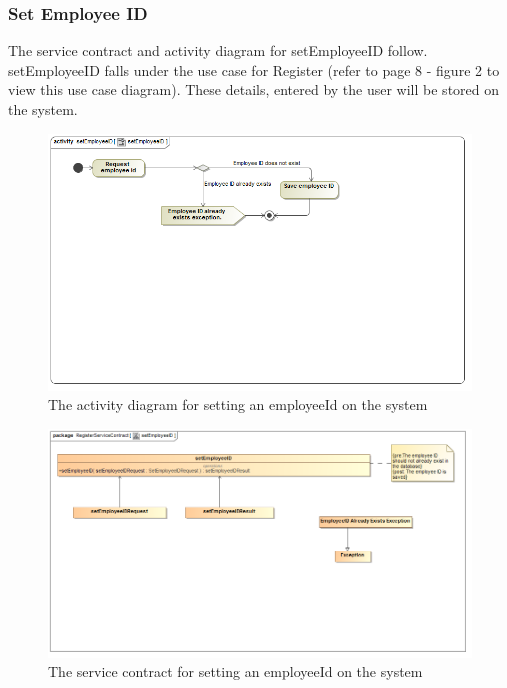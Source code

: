 \documentclass[a4paper,12pt]{report}
\begin{document}
\subsubsection{Set Employee ID }
The service contract and activity diagram for setEmployeeID follow. setEmployeeID falls under the use case for Register (refer to page 8 - figure 2 to view this use case diagram). These details, entered by the user will be stored on the system.
\begin{figure}[H]
  \centering
    \includegraphics[width=1.0\textwidth]{../Diagrams/Register/ActivityDiagrams/setEmployeeID1.png}
    \caption{The activity diagram for setting an employeeId on the system} 
\end{figure}
\begin{figure}[H]
  \centering
    \includegraphics[width=1.0\textwidth]{../Diagrams/Register/ServiceContractsRegister/setEmployeeIDServiceContract.png}
    \caption{The service contract for setting an employeeId on the system} 
\end{figure}
\end{document}
